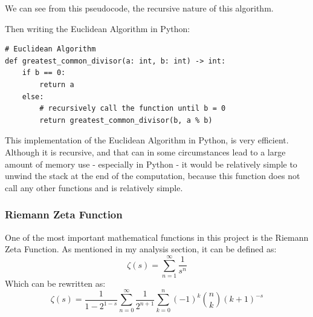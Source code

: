 \documentclass[12pt]{article}
\begin{document}
We can see from this pseudocode, the recursive nature of this algorithm.

Then writing the Euclidean Algorithm in Python:

\begin{lstlisting}
# Euclidean Algorithm
def greatest_common_divisor(a: int, b: int) -> int:
    if b == 0:
        return a
    else:
        # recursively call the function until b = 0
        return greatest_common_divisor(b, a % b)
\end{lstlisting}

This implementation of the Euclidean Algorithm in Python, is very efficient. Although it is recursive, and that can in some circumstances lead to a large amount of memory use - especially in Python - it would be relatively simple to unwind the stack at the end of the computation, because this function does not call any other functions and is relatively simple.


\subsubsection{Riemann Zeta Function}
One of the most important mathematical functions in this project is the Riemann Zeta Function. As mentioned in my analysis section, it can be defined as:
    $$\zeta(s) = \sum^{\infty}_{n=1}\frac{1}{s^n}$$
Which can be rewritten as:
    $$\zeta(s) = \frac{1}{1-2^{1-s}} \sum_{n=0}^{\infty} \frac{1}{2^{n+1}} \sum_{k=0}^{n} (-1)^k \binom{n}{k} (k+1)^{-s}$$
\end{document}
